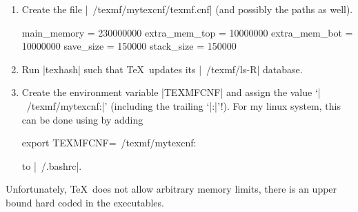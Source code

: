 \begin{enumerate}
	\item Create the file |~/texmf/mytexcnf/texmf.cnf| (and possibly the paths as well).
\begin{codeexample}
main_memory = 230000000 %
extra_mem_top = 10000000     %
extra_mem_bot = 10000000     %
save_size = 150000	%
stack_size = 150000	%

\end{codeexample}
	\item Run |texhash| such that \TeX\ updates its |~/texmf/ls-R| database.
	\item Create the environment variable |TEXMFCNF| and assign the value `|~/texmf/mytexcnf:|' (including the trailing `|:|'!). For my linux system, this can be done using by adding
\begin{codeexample}
export TEXMFCNF=~/texmf/mytexcnf:
\end{codeexample}
	to |~/.bashrc|.
\end{enumerate}

Unfortunately, \TeX\ does not allow arbitrary memory limits, there is an upper bound hard coded in the executables.
